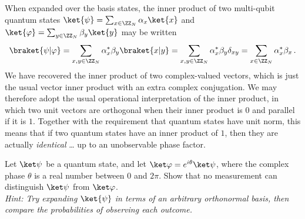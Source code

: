       When expanded over the basis states, the inner product of two multi-qubit quantum
        states $\ket{\psi} = \sum_{x \in \ZZ_N} \alpha_x \ket{x}$ and $\ket{\varphi} =
        \sum_{y \in \ZZ_N} \beta_y \ket{y}$ may be written
      \[
        \braket{\psi|\varphi} = \sum_{x, y \in \ZZ_N} \alpha^*_x \beta_y \braket{x|y} =
        \sum_{x, y \in \ZZ_N} \alpha^*_x \beta_y \delta_{xy} = \sum_{x \in \ZZ_N} \alpha^*_x \beta_x\, .
      \]
      We have recovered the inner product of two complex-valued vectors, which
        is just the usual vector inner product with an extra complex conjugation.
        We may therefore adopt the usual operational interpretation of the inner
        product, in which two unit vectors are orthogonal when their inner product is $0$
        and parallel if it is $1$. Together with the requirement that
        quantum states have unit norm, this means that if two quantum states
        have an inner product of $1$, then they are actually \emph{identical} \ldots
        up to an unobservable phase factor.



      \begin{exercise}\label{ex:global-phase}
        Let $\ket\psi$ be a quantum state, and let $\ket\varphi =
        e^{i\theta}\ket\psi$, where the complex phase $\theta$ is a real number between $0$ and
        $2\pi$. Show that no measurement can distinguish $\ket\psi$ from
        $\ket\varphi$.\\
        \emph{Hint: Try expanding $\ket{\psi}$ in terms of an arbitrary
        orthonormal basis, then compare the probabilities of observing each
        outcome.}
      \end{exercise}

